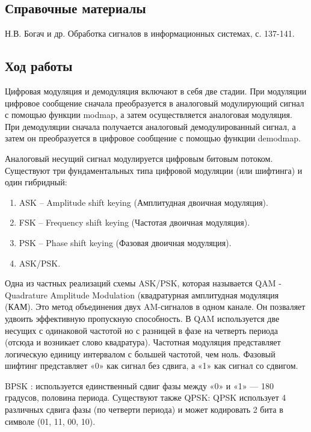 \documentclass[10pt,a4paper]{article}
\begin{document}
\subsection{Справочные материалы}
Н.В. Богач и др. Обработка сигналов в информационных системах, с. 137-141.

\subsection{Ход работы}
Цифровая модуляция и демодуляция включают в себя две стадии. При модуляции цифровое сообщение сначала преобразуется в аналоговый модулирующий сигнал с помощью функции modmap, а затем осуществляется аналоговая модуляция. При демодуляции сначала получается аналоговый демодулированный сигнал, а затем он преобразуется в цифровое сообщение с помощью функции demodmap.

Аналоговый несущий сигнал модулируется цифровым битовым потоком.
Существуют три фундаментальных типа цифровой модуляции (или шифтинга) и один гибридный:
\begin{enumerate}
    \item ASK – Amplitude shift keying (Амплитудная двоичная модуляция).
    \item FSK – Frequency shift keying (Частотая двоичная модуляция).
    \item PSK – Phase shift keying (Фазовая двоичная модуляция).
    \item ASK/PSK.
\end{enumerate}
Одна из частных реализаций схемы ASK/PSK, которая называется QAM - Quadrature Amplitude Modulation (квадратурная амплитудная модуляция (КАМ). Это метод объединения двух AM-сигналов в одном канале. Он позваляет удвоить эффективную пропускную способность. В QAM используется две несущих с одинаковой частотой но с разницей в фазе на четверть периода (отсюда и возникает слово квадратура). 
Частотная модуляция представляет логическую единицу интервалом с большей частотой, чем ноль.
Фазовый шифтинг представляет «0» как сигнал без сдвига, а «1» как сигнал со сдвигом.

BPSK : используется единственный сдвиг фазы между «0» и «1» — 180 градусов, половина периода.
Существуют также QPSK:
QPSK использует 4 различных сдвига фазы (по четверти периода) и может кодировать 2 бита в символе (01, 11, 00, 10). 
\end{document}
